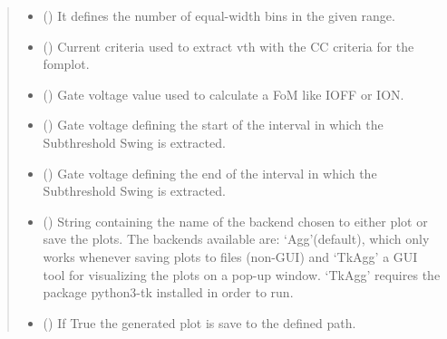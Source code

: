 \documentclass[letterpaper,10pt,english,openany, oneside]{sphinxmanual}
\begin{document}
\begin{fulllineitems}
\begin{quote}
\begin{description}
\begin{itemize}
\item {} 
 () \textendash{} It defines the number of equal-width bins in the given range.

\item {} 
 () \textendash{} Current criteria used to extract vth with the CC criteria for the fomplot.

\item {} 
 () \textendash{} Gate voltage value used to calculate a FoM like IOFF or ION.

\item {} 
 () \textendash{} Gate voltage defining the start of the interval in which the Subthreshold Swing is extracted.

\item {} 
 () \textendash{} Gate voltage defining the end of the interval in which the Subthreshold Swing is extracted.

\item {} 
 () \textendash{} String containing the name of the backend chosen to either plot or save the plots. The backends available are:
‘Agg’(default), which only works whenever saving plots to files (non-GUI) and ‘TkAgg’ a GUI tool for visualizing the plots on a pop-up window.
‘TkAgg’ requires the package python3-tk installed in order to run.

\item {} 
 () \textendash{} If True the generated plot is save to the defined path.

\end{itemize}

\end{description}\end{quote}

\end{fulllineitems}

\end{document}
